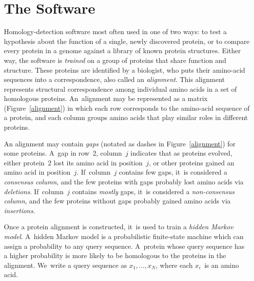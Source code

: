 \documentclass[preprint,nonatbib,blockstyle,nocopyrightspace,times]{sigplanconf}
\newcommand\figref[1]{Figure~\ref{#1}}
\newcommand\seclabel[1]{\label{sec:#1}}
\begin{document}


\section{The Software}


\seclabel{viterbi}

Homology-detection software most often used in one of two ways:
to test a hypothesis about 
the function of a single, newly discovered protein, or 
to compare every protein in a genome against a library of known protein 
structures.
Either way, 
the software is \emph{trained}
on a group of proteins that share function and structure.
These proteins are identified by a biologist, who puts
their amino-acid sequences into a correspondence, also called an
\emph{alignment}. 
This alignment represents structural
correspondence among individual amino acids in a set of homologous proteins.
An~alignment may be represented as a matrix
(Figure~\ref{alignment}) 
in which each row corresponds to the amino-acid sequence of a protein,
and each column groups amino acids that play similar roles in
different proteins.

An alignment may contain \emph{gaps} (notated as dashes in
\figref{alignment}) for some proteins.
A~gap in row~2, column~$j$ indicates that as proteins evolved, either 
protein~2 lost its amino acid in position~$j$, or 
other proteins gained an amino acid in position~$j$.
If~column~$j$ contains few gaps, 
it~is considered a \emph{consensus column},
and the few proteins with gaps probably lost amino acids via
\emph{deletions}. 
If~column~$j$ contains \emph{mostly} gaps, 
it~is considered a \emph{non-consensus column},
and the few proteins without gaps probably gained amino acids via
\emph{insertions}. 

Once a protein alignment is constructed, it~is used to train a
\emph{hidden Markov model}. 
A~hidden Markov model is a probabilistic finite-state machine which 
can assign a probability to any query sequence.
A~protein whose query sequence has a higher probability is more likely to %
be homologous to the proteins in the alignment.
We~write a query sequence as $x_1, \ldots, x_{\scriptscriptstyle N}$,
where each $x_i$~is 
an amino acid.
\end{document}
